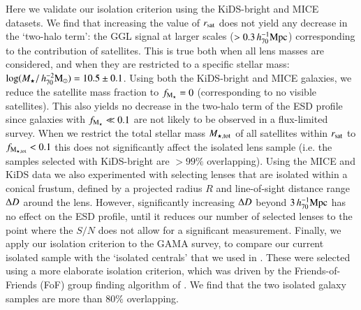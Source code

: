 \documentclass{aa}
\newcommand{\hmsun}{\,h_{70}^{-2} {\rm M_\odot}}
\newcommand{\hMpc}{\,h_{70}^{-1}{\rm{Mpc}} }
\renewcommand{\Updelta}{{\rm \Delta}}
\newcommand{\un}[1]{_{\rm #1}}
\begin{document}
Here we validate our isolation criterion using the KiDS-bright and MICE datasets. We find that increasing the value of $r\un{sat}$ does not yield any decrease in the `two-halo term': the GGL signal at larger scales ($>0.3\hMpc$) corresponding to the contribution of satellites. This is true both when all lens masses are considered, and when they are restricted to a specific stellar mass: $\log(M_\star/\hmsun)=10.5\pm0.1$. Using both the KiDS-bright and MICE galaxies, we reduce the satellite mass fraction to $f\un{M_\star}=0$ (corresponding to no visible satellites). This also yields no decrease in the two-halo term of the ESD profile since galaxies with $f\un{M_\star}\ll0.1$ are not likely to be observed in a flux-limited survey. When we restrict the total stellar mass $M\un{\star,tot}$ of all satellites within $r\un{sat}$ to $f\un{M\un{\star,tot}}<0.1$ this does not significantly affect the isolated lens sample (i.e. the samples selected with KiDS-bright are $>99\%$ overlapping). Using the MICE and KiDS data we also experimented with selecting lenses that are isolated within a conical frustum, defined by a projected radius $R$ and line-of-sight distance range $\Updelta D$ around the lens. However, significantly increasing $\Updelta D$ beyond $3 \hMpc$ has no effect on the ESD profile, until it reduces our number of selected lenses to the point where the $S/N$ does not allow for a significant measurement. Finally, we apply our isolation criterion to the GAMA survey, to compare our current isolated sample with the `isolated centrals' that we used in \cite{brouwer2017}. These were selected using a more elaborate isolation criterion, which was driven by the Friends-of-Friends (FoF) group finding algorithm of \cite{robotham2011}. We find that the two isolated galaxy samples are more than $80\%$ overlapping.
\end{document}

